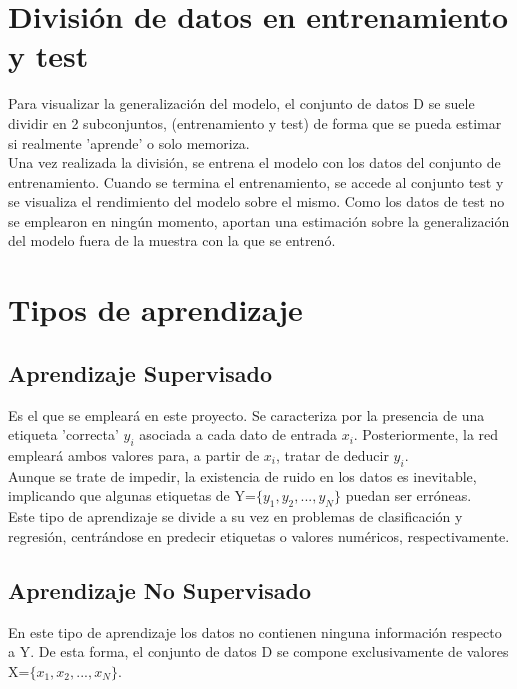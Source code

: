 \section{División de datos en entrenamiento y test}

Para visualizar la generalización del modelo, el conjunto de datos D se suele dividir en 2 subconjuntos, (entrenamiento y test) de forma que se pueda estimar si realmente 'aprende' o solo memoriza.\\
Una vez realizada la división, se entrena el modelo con los datos del conjunto de entrenamiento. Cuando se termina el entrenamiento, se accede al conjunto test y se visualiza el rendimiento del modelo sobre el mismo. Como los datos de test no se emplearon en ningún momento, aportan una estimación sobre la generalización del modelo fuera de la muestra con la que se entrenó. 

\section{Tipos de aprendizaje}

\subsection{Aprendizaje Supervisado}


Es el que se empleará en este proyecto. 
Se caracteriza por la presencia de una etiqueta 'correcta' $y_i$ asociada a cada dato de entrada $x_i$. Posteriormente, la red empleará ambos valores para, a partir de $x_i$, tratar de deducir $y_i$. \cite{Learning_From_Data} \\
Aunque se trate de impedir, la existencia de ruido en los datos es inevitable, implicando que algunas etiquetas de Y=$\{y_1, y_2, ..., y_N\}$ puedan ser erróneas. \\
Este tipo de aprendizaje se divide a su vez en problemas de clasificación y regresión, centrándose en predecir etiquetas o valores numéricos, respectivamente.

\subsection{Aprendizaje No Supervisado}

En este tipo de aprendizaje los datos no contienen ninguna información respecto a Y. De esta forma, el conjunto de datos D se compone exclusivamente de valores X=$\{x_1, x_2, ..., x_N\}$. \cite{Learning_From_Data}

